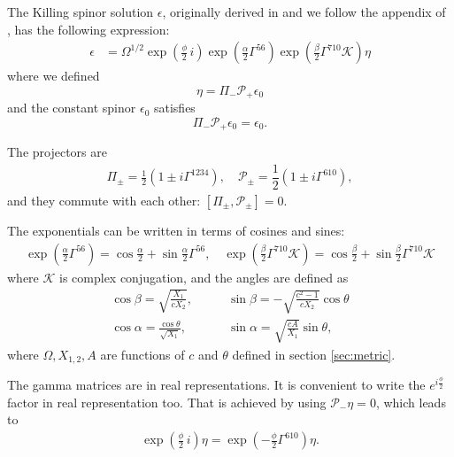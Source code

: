 
The Killing spinor solution $\epsilon$, originally derived in \cite{Pilch:2003jg} and we follow the appendix of \cite{Chen-Lin:2015xlh}, has the following expression:
\begin{align}
\epsilon &= \Omega^{1/2} \exp{\left(\frac{\phi}{2}\, i \right)} \exp{\left(\frac{\alpha}{2}\Gamma^{56} \right)} \exp{\left(\frac{\beta}{2}\Gamma^{7 10} \mathcal{K} \right)} \eta
\end{align}
where we defined
\begin{equation}
\eta = \Pi_{-} \mathcal{P}_+ \epsilon_0
\end{equation}
and the constant spinor $\epsilon_0$ satisfies
\begin{equation}
 \Pi_- \mathcal{P}_+ \epsilon_0 = \epsilon_0.
\end{equation}

The projectors are
\begin{align}
\Pi_\pm = 
\frac{1}{2}\left(1 \pm i\Gamma^{1234}\right), 
\quad
\mathcal{P}_{\pm} =
\dfrac{1}{2} \left(1\pm i\Gamma^{6 10}\right),
\end{align}
and they commute with each other: $[\Pi_\pm, \mathcal{P}_{\pm}]=0$.

The exponentials can be written in terms of cosines and sines:
\begin{align}
\exp{\left(\frac{\alpha}{2}\Gamma^{56} \right)} = \cos\frac{\alpha}{2} + \sin\frac{\alpha}{2}\Gamma^{5 6},
\quad
\exp{\left(\frac{\beta}{2}\Gamma^{7 10} \mathcal{K} \right)} = \cos\frac{\beta}{2} + \sin\frac{\beta}{2}\Gamma^{7 10}\mathcal{K}
\end{align}
where $\mathcal{K}$ is complex conjugation, and the angles are defined as
\begin{align}
\cos\beta = \sqrt{\frac{X_1}{c X_2}}, \quad 
&\quad
\sin\beta = -\sqrt{\frac{c^2 - 1}{c X_2}}\cos\theta\\
%
\cos\alpha = \frac{\cos\theta}{\sqrt{X_1}}, 
&\quad
\sin\alpha = \sqrt{\frac{c A}{X_1}}\sin\theta,
\end{align}
where $\Omega, X_{1,2}, A$ are functions of $c$ and $\theta$ defined in section \ref{sec:metric}.


The gamma matrices are in real representations. It is convenient to write the $e^{i \frac{\phi}{2}}$ factor in real representation too. 
That is achieved by using $\mathcal{P}_- \eta = 0 $, which leads to
\begin{align}
 \exp{\left(\frac{\phi}{2}\, i \right)} \eta 
    = \exp{\left(-\frac{\phi}{2}\Gamma^{6 10} \right)} \eta. 
\end{align}

